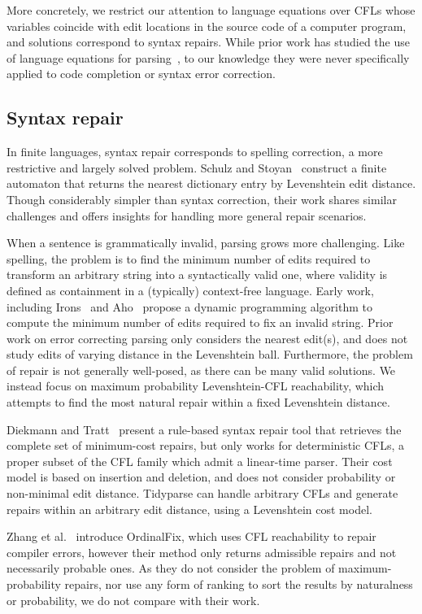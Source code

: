 \documentclass[sigplan,review,acmsmall,nonacm,screen,anonymous]{acmart}\settopmatter{printfolios=false,printccs=false,printacmref=false}
\begin{document}
More concretely, we restrict our attention to language equations over CFLs whose variables coincide with edit locations in the source code of a computer program, and solutions correspond to syntax repairs. While prior work has studied the use of language equations for parsing~\cite{might2011parsing}, to our knowledge they were never specifically applied to code completion or syntax error correction.

\subsection{Syntax repair}

In finite languages, syntax repair corresponds to spelling correction, a more restrictive and largely solved problem. Schulz and Stoyan~\cite{schulz2002fast} construct a finite automaton that returns the nearest dictionary entry by Levenshtein edit distance. Though considerably simpler than syntax correction, their work shares similar challenges and offers insights for handling more general repair scenarios.

When a sentence is grammatically invalid, parsing grows more challenging. Like spelling, the problem is to find the minimum number of edits required to transform an arbitrary string into a syntactically valid one, where validity is defined as containment in a (typically) context-free language. Early work, including Irons~\cite{irons1963error} and Aho~\cite{aho1972minimum} propose a dynamic programming algorithm to compute the minimum number of edits required to fix an invalid string. Prior work on error correcting parsing only considers the nearest edit(s), and does not study edits of varying distance in the Levenshtein ball. Furthermore, the problem of repair is not generally well-posed, as there can be many valid solutions. We instead focus on maximum probability Levenshtein-CFL reachability, which attempts to find the most natural repair within a fixed Levenshtein distance.

Diekmann and Tratt~\cite{diekmann2018dont} present a rule-based syntax repair tool that retrieves the complete set of minimum-cost repairs, but only works for deterministic CFLs, a proper subset of the CFL family which admit a linear-time parser. Their cost model is based on insertion and deletion, and does not consider probability or non-minimal edit distance. Tidyparse can handle arbitrary CFLs and generate repairs within an arbitrary edit distance, using a Levenshtein cost model.

Zhang et al.~\cite{zhang2023ordinalfix} introduce OrdinalFix, which uses CFL reachability to repair compiler errors, however their method only returns admissible repairs and not necessarily probable ones. As they do not consider the problem of maximum-probability repairs, nor use any form of ranking to sort the results by naturalness or probability, we do not compare with their work.
\end{document}
